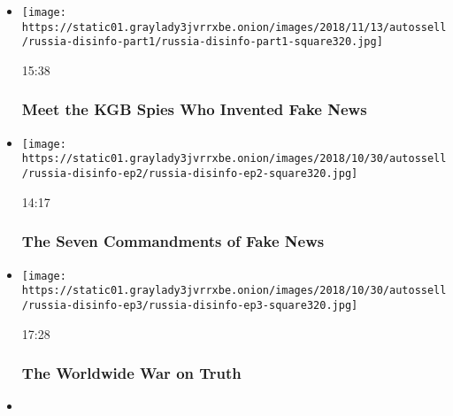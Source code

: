 \begin{itemize}
\item
  \href{https://www.nytimes3xbfgragh.onion/video/opinion/100000006210828/russia-disinformation-fake-news.html?action=click\&module=video-series-bar\&region=header\&pgtype=Article\&playlistId=video/opinion}{}

  \texttt{[image: https://static01.graylady3jvrrxbe.onion/images/2018/11/13/autossell/russia-disinfo-part1/russia-disinfo-part1-square320.jpg]}

  15:38

  \hypertarget{meet-the-kgb-spies-who-invented-fake-news}{%
  \subsubsection{Meet the KGB Spies Who Invented Fake
  News}\label{meet-the-kgb-spies-who-invented-fake-news}}
\item
  \href{https://www.nytimes3xbfgragh.onion/video/opinion/100000006188102/what-is-pizzagate.html?action=click\&module=video-series-bar\&region=header\&pgtype=Article\&playlistId=video/opinion}{}

  \texttt{[image: https://static01.graylady3jvrrxbe.onion/images/2018/10/30/autossell/russia-disinfo-ep2/russia-disinfo-ep2-square320.jpg]}

  14:17

  \hypertarget{the-seven-commandments-of-fake-news}{%
  \subsubsection{The Seven Commandments of Fake
  News}\label{the-seven-commandments-of-fake-news}}
\item
  \href{https://www.nytimes3xbfgragh.onion/video/opinion/100000006188105/countering-disinformation-active-measures.html?action=click\&module=video-series-bar\&region=header\&pgtype=Article\&playlistId=video/opinion}{}

  \texttt{[image: https://static01.graylady3jvrrxbe.onion/images/2018/10/30/autossell/russia-disinfo-ep3/russia-disinfo-ep3-square320.jpg]}

  17:28

  \hypertarget{the-worldwide-war-on-truth}{%
  \subsubsection{The Worldwide War on
  Truth}\label{the-worldwide-war-on-truth}}
\item
  \href{https://www.nytimes3xbfgragh.onion/video/opinion/100000007278127/coronavirus-vaccine-update.html?action=click\&module=video-series-bar\&region=header\&pgtype=Article\&playlistId=video/opinion}{}


\end{itemize}
